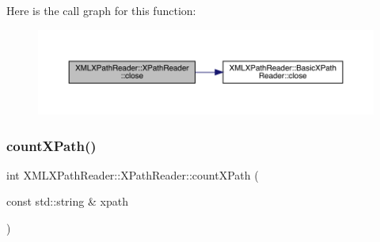 Here is the call graph for this function\+:
\nopagebreak
\begin{figure}[H]
\begin{center}
\leavevmode
\includegraphics[width=350pt]{d3/d5a/classXMLXPathReader_1_1XPathReader_a2b6cfab8c9771da838a2bca6c9f23cb9_cgraph}
\end{center}
\end{figure}
\mbox{\label{classXMLXPathReader_1_1XPathReader_a9fd76703ea5321a4666ca9a0c07a222a}} 
\subsubsection{\texorpdfstring{countXPath()}{countXPath()}\hspace{0.1cm}{\footnotesize\ttfamily [1/2]}}
{\footnotesize\ttfamily int X\+M\+L\+X\+Path\+Reader\+::\+X\+Path\+Reader\+::count\+X\+Path (\begin{DoxyParamCaption}\item[{const std\+::string \&}]{xpath }\end{DoxyParamCaption})\hspace{0.3cm}{\ttfamily [inline]}}

